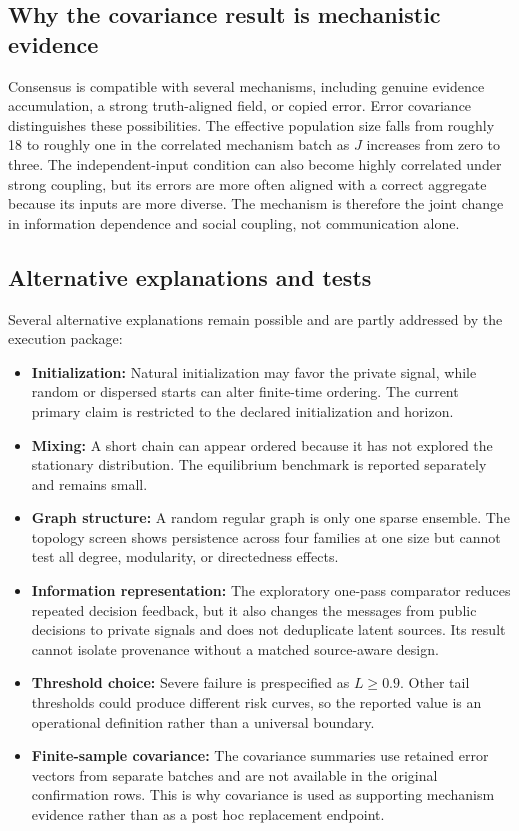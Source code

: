 \documentclass[11pt,a4paper]{article}
\begin{document}
\subsection{Why the covariance result is mechanistic evidence}

Consensus is compatible with several mechanisms, including genuine evidence accumulation, a strong truth-aligned field, or copied error. Error covariance distinguishes these possibilities. The effective population size falls from roughly 18 to roughly one in the correlated mechanism batch as $J$ increases from zero to three. The independent-input condition can also become highly correlated under strong coupling, but its errors are more often aligned with a correct aggregate because its inputs are more diverse. The mechanism is therefore the joint change in information dependence and social coupling, not communication alone.

\subsection{Alternative explanations and tests}

Several alternative explanations remain possible and are partly addressed by the execution package:

\begin{itemize}
  \item \textbf{Initialization:} Natural initialization may favor the private signal, while random or dispersed starts can alter finite-time ordering. The current primary claim is restricted to the declared initialization and horizon.
  \item \textbf{Mixing:} A short chain can appear ordered because it has not explored the stationary distribution. The equilibrium benchmark is reported separately and remains small.
  \item \textbf{Graph structure:} A random regular graph is only one sparse ensemble. The topology screen shows persistence across four families at one size but cannot test all degree, modularity, or directedness effects.
  \item \textbf{Information representation:} The exploratory one-pass comparator reduces repeated decision feedback, but it also changes the messages from public decisions to private signals and does not deduplicate latent sources. Its result cannot isolate provenance without a matched source-aware design.
  \item \textbf{Threshold choice:} Severe failure is prespecified as $L\ge0.9$. Other tail thresholds could produce different risk curves, so the reported value is an operational definition rather than a universal boundary.
  \item \textbf{Finite-sample covariance:} The covariance summaries use retained error vectors from separate batches and are not available in the original confirmation rows. This is why covariance is used as supporting mechanism evidence rather than as a post hoc replacement endpoint.
\end{itemize}
\end{document}
